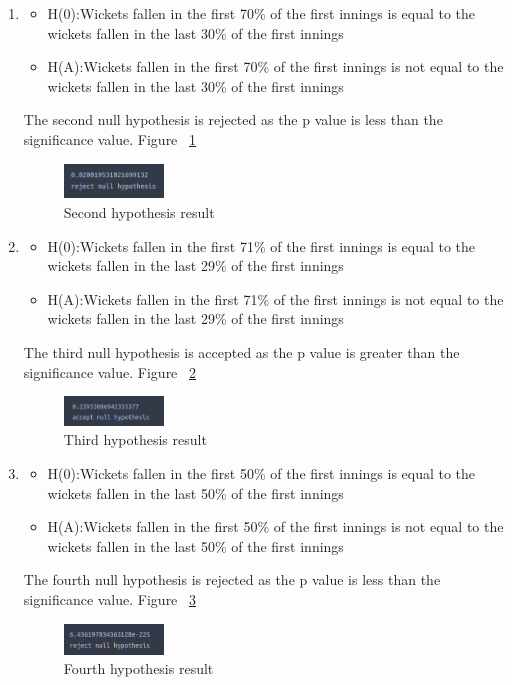 \documentclass[fleqn,10pt]{wlscirep}
\begin{document}
\begin{enumerate}
\item
\begin{itemize}
    \item H(0):Wickets fallen in the first 70\% of the first innings is equal to the wickets fallen in the last 30\% of the first innings
    \item H(A):Wickets fallen in the first 70\% of the first innings is not equal to the wickets fallen in the last 30\% of the first innings
\end{itemize}
The second null hypothesis is rejected as the p value is less than the significance value. Figure ~\ref{fig:thirteen}
\begin{figure}[H]
    \centering
    \includegraphics[width=0.25\textwidth]{secondone.png}
    \caption{Second hypothesis result}
    \label{fig:thirteen}
  \end{figure}

\item
\begin{itemize}
    \item H(0):Wickets fallen in the first 71\% of the first innings is equal to the wickets fallen in the last 29\% of the first innings
    \item H(A):Wickets fallen in the first 71\% of the first innings is not equal to the wickets fallen in the last 29\% of the first innings
\end{itemize}
The third null hypothesis is accepted as the p value is greater than the significance value. Figure ~\ref{fig:fourteen}
\begin{figure}[H]
    \centering
    \includegraphics[width=0.25\textwidth]{secondsecond.png}
    \caption{Third hypothesis result}
    \label{fig:fourteen}
  \end{figure}

\item
\begin{itemize}
    \item H(0):Wickets fallen in the first 50\% of the first innings is equal to the wickets fallen in the last 50\% of the first innings
    \item H(A):Wickets fallen in the first 50\% of the first innings is not equal to the wickets fallen in the last 50\% of the first innings
\end{itemize}
The fourth null hypothesis is rejected as the p value is less than the significance value. Figure ~\ref{fig:fifteen}
\begin{figure}[H]
    \centering
    \includegraphics[width=0.25\textwidth]{secondthird.png}
    \caption{Fourth hypothesis result}
    \label{fig:fifteen}
  \end{figure}


\end{enumerate}
\end{document}
